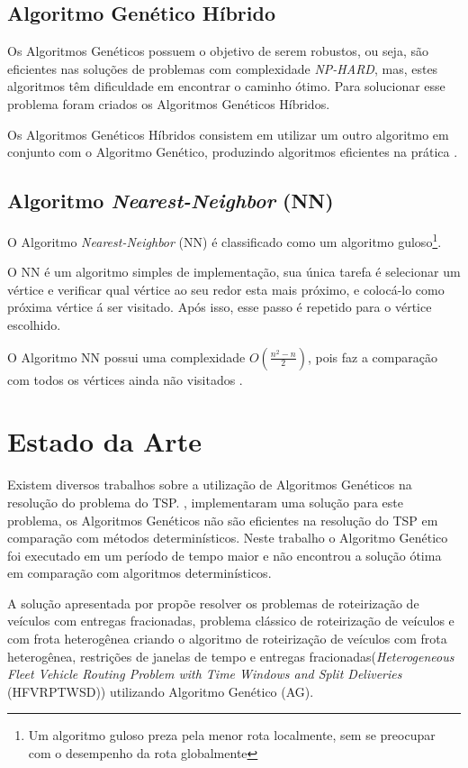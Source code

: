 \documentclass[12pt,openright,a4paper,oneside]{tcc}
\begin{document}
		\section{Algoritmo Genético Híbrido}

			Os Algoritmos Genéticos possuem o objetivo de serem robustos, ou seja, são eficientes nas soluções de problemas com complexidade \textit{NP-HARD}, mas, estes algoritmos têm dificuldade em encontrar o caminho ótimo. Para solucionar esse problema foram criados os Algoritmos Genéticos Híbridos.

			Os Algoritmos Genéticos Híbridos consistem em utilizar um outro algoritmo em conjunto com o Algoritmo Genético, produzindo algoritmos eficientes na prática \cite{TravelingTheory}.

        \section{Algoritmo \textit{Nearest-Neighbor} (NN)}

            O Algoritmo \textit{Nearest-Neighbor} (NN) é classificado como um algoritmo guloso\footnote{Um algoritmo guloso preza pela menor rota localmente, sem se preocupar com o desempenho da rota globalmente}.

            O NN é um algoritmo simples de implementação, sua única tarefa é selecionar um vértice e verificar qual vértice ao seu redor esta mais próximo, e colocá-lo como próxima vértice á ser visitado. Após isso, esse passo é repetido para o vértice escolhido. 

            O Algoritmo NN possui uma complexidade $O(\frac{n^2-n}{2})$, pois faz a comparação com todos os vértices ainda não visitados \cite{NN}.
			
		\chapter{Estado da Arte}
		
			Existem diversos trabalhos sobre a utilização de Algoritmos Genéticos na resolução do problema do TSP. , implementaram uma solução para este problema, os Algoritmos Genéticos não são eficientes 
			na resolução do TSP em comparação com métodos determinísticos. Neste trabalho o Algoritmo Genético foi executado em um período de tempo maior e não encontrou a solução ótima em comparação com algoritmos determinísticos.

			A solução apresentada por  propõe resolver os problemas de roteirização de 
			veículos com entregas fracionadas, problema clássico de roteirização de veículos e com 
			frota heterogênea criando o algoritmo de roteirização de veículos com frota heterogênea, 
			restrições de janelas de tempo e entregas fracionadas(\textit{Heterogeneous Fleet Vehicle 
			Routing Problem with Time Windows and Split Deliveries} (HFVRPTWSD)) utilizando Algoritmo 
			Genético (AG).
\end{document}
